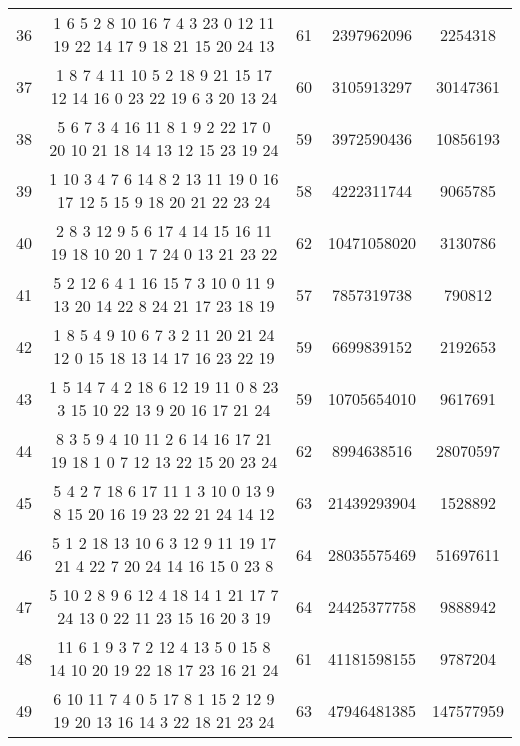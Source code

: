 \documentclass[a4paper,11pt,oneside,openany]{jsbook}
\begin{document}
\begin{table}[]
{\begin{tabular}{|c|c|c|c|c|}
36 & 1 6 5 2 8 10 16 7 4 3 23 0 12 11 19 22 14 17 9 18 21 15 20 24 13  & 61 & 2397962096 & 2254318 \\
37 & 1 8 7 4 11 10 5 2 18 9 21 15 17 12 14 16 0 23 22 19 6 3 20 13 24  & 60 & 3105913297 & 30147361 \\
38 & 5 6 7 3 4 16 11 8 1 9 2 22 17 0 20 10 21 18 14 13 12 15 23 19 24  & 59 & 3972590436 & 10856193 \\
39 & 1 10 3 4 7 6 14 8 2 13 11 19 0 16 17 12 5 15 9 18 20 21 22 23 24  & 58 & 4222311744 & 9065785 \\
40 & 2 8 3 12 9 5 6 17 4 14 15 16 11 19 18 10 20 1 7 24 0 13 21 23 22  & 62 & 10471058020 & 3130786 \\
41 & 5 2 12 6 4 1 16 15 7 3 10 0 11 9 13 20 14 22 8 24 21 17 23 18 19  & 57 & 7857319738 & 790812 \\
42 & 1 8 5 4 9 10 6 7 3 2 11 20 21 24 12 0 15 18 13 14 17 16 23 22 19  & 59 & 6699839152 & 2192653 \\
43 & 1 5 14 7 4 2 18 6 12 19 11 0 8 23 3 15 10 22 13 9 20 16 17 21 24  & 59 & 10705654010 & 9617691 \\
44 & 8 3 5 9 4 10 11 2 6 14 16 17 21 19 18 1 0 7 12 13 22 15 20 23 24  & 62 & 8994638516 & 28070597 \\
45 & 5 4 2 7 18 6 17 11 1 3 10 0 13 9 8 15 20 16 19 23 22 21 24 14 12  & 63 & 21439293904 & 1528892 \\
46 & 5 1 2 18 13 10 6 3 12 9 11 19 17 21 4 22 7 20 24 14 16 15 0 23 8  & 64 & 28035575469 & 51697611 \\
47 & 5 10 2 8 9 6 12 4 18 14 1 21 17 7 24 13 0 22 11 23 15 16 20 3 19  & 64 & 24425377758 & 9888942 \\
48 & 11 6 1 9 3 7 2 12 4 13 5 0 15 8 14 10 20 19 22 18 17 23 16 21 24  & 61 & 41181598155 & 9787204 \\
49 & 6 10 11 7 4 0 5 17 8 1 15 2 12 9 19 20 13 16 14 3 22 18 21 23 24  & 63 & 47946481385 & 147577959 \\ \hline
\end{tabular}
}
\end{table}
\end{document}
